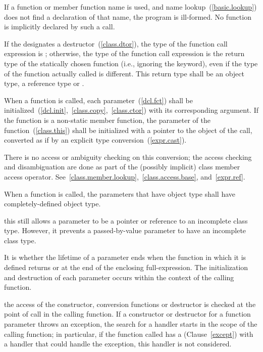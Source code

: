 \pnum
\begin{note}
If a function or member function name is used, and name
lookup~(\ref{basic.lookup}) does not find a declaration of that name,
the program is ill-formed. No function is implicitly declared by such a
call.
\end{note}

\pnum
If the  designates a destructor~(\ref{class.dtor}),
the type of the function call expression is ; otherwise, the
type of the function call expression is the return type of the
statically chosen function (i.e., ignoring the  keyword),
even if the type of the function actually called is different.
%
This return type shall be an object type, a reference type or \cv{}
.

\pnum
{}%
%
%
When a function is called, each parameter~(\ref{dcl.fct}) shall be
initialized~(\ref{dcl.init},~\ref{class.copy},~\ref{class.ctor}) with
its corresponding argument.
If the function is a non-static member
function, the  parameter of the function~(\ref{class.this})
shall be initialized with a pointer to the object of the call, converted
as if by an explicit type conversion~(\ref{expr.cast}).
\begin{note}
There is no access or ambiguity checking on this conversion; the access
checking and disambiguation are done as part of the (possibly implicit)
class member access operator.
See~\ref{class.member.lookup},~\ref{class.access.base},
and~\ref{expr.ref}.
\end{note}
When a function is called, the parameters that have object type shall
have completely-defined object type.
\begin{note}
this still allows a parameter to be a pointer or reference to an
incomplete class type. However, it prevents a passed-by-value parameter
to have an incomplete class type.
\end{note}
It is  whether the
lifetime of a parameter ends when the function in which it is defined
returns or at the end of the enclosing full-expression.
The initialization and destruction of each parameter occurs
within the context of the calling function.
\begin{example}
the access of the constructor, conversion functions or destructor is
checked at the point of call in the calling function. If a constructor
or destructor for a function parameter throws an exception, the search
for a handler starts in the scope of the calling function; in
particular, if the function called has a 
(Clause~\ref{except}) with a handler that could handle the exception,
this handler is not considered.
\end{example}

